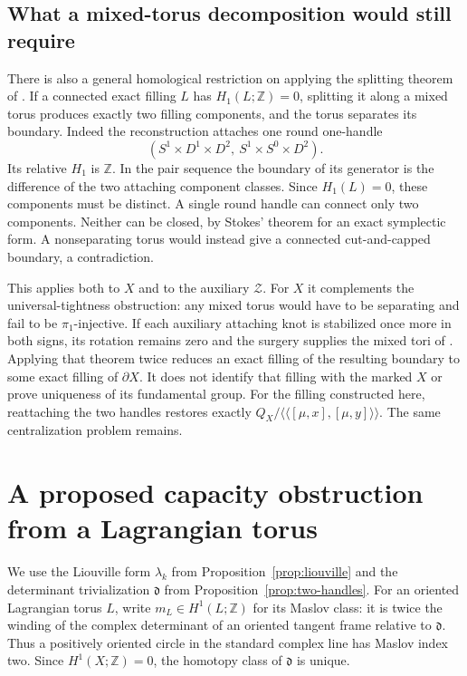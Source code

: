 \documentclass[11pt]{amsart}
\theoremstyle{definition}
\theoremstyle{remark}
\newcommand{\Z}{\mathbb Z}
\newcommand{\nc}[1]{\langle\!\langle #1\rangle\!\rangle}
\begin{document}
\subsection{What a mixed-torus decomposition would still require}
There is also a general homological restriction on applying the
splitting theorem of \cite[Theorem 1.1]{CM25}. If a connected exact
filling $L$ has $H_1(L;\Z)=0$, splitting it along a mixed torus
produces exactly two filling components, and the torus separates its
boundary. Indeed the reconstruction attaches one round one-handle
\[
 (S^1\times D^1\times D^2,\ S^1\times S^0\times D^2).
\]
Its relative $H_1$ is $\Z$. In the pair sequence the boundary of its
generator is the difference of the two attaching component classes.
Since $H_1(L)=0$, these components must be distinct. A single round
handle can connect only two components. Neither can be closed, by
Stokes' theorem for an exact symplectic form. A nonseparating torus
would instead give a connected cut-and-capped boundary, a contradiction.

This applies both to $X$ and to the auxiliary $\mathcal Z$.
For $X$ it complements the universal-tightness obstruction: any mixed
torus would have to be separating and fail to be $\pi_1$-injective.
If each auxiliary attaching knot is stabilized once more in both signs,
its rotation remains zero and the surgery supplies the mixed tori of
\cite[Theorem 1.4]{CM25}. Applying that theorem twice reduces an exact
filling of the resulting boundary to some exact filling of $\partial X$.
It does not identify that filling with the marked $X$ or prove uniqueness
of its fundamental group. For the filling constructed here, reattaching
the two handles restores exactly $Q_X/\nc{[\mu,x],[\mu,y]}$.
The same centralization problem remains.

\section{A proposed capacity obstruction from a Lagrangian torus}
\label{sec:lagrangian-capacity}

We use the Liouville form $\lambda_k$ from
Proposition~\ref{prop:liouville} and the determinant trivialization
$\mathfrak d$ from Proposition~\ref{prop:two-handles}. For an oriented
Lagrangian torus $L$, write $m_L\in H^1(L;\Z)$ for its Maslov class:
it is twice the winding of the complex determinant of an oriented
tangent frame relative to $\mathfrak d$. Thus a positively oriented
circle in the standard complex line has Maslov index two. Since
$H^1(X;\Z)=0$, the homotopy class of $\mathfrak d$ is unique.
\end{document}
